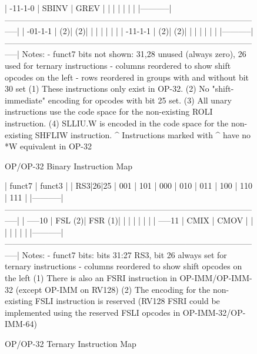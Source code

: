 \begin{figure}[t]
\begin{center}
\begin{minipage}{\linewidth}
\begin{verbnobox}[\tiny]
|  -11-1-0  |   SBINV   |    GREV   |           |           |           |           |           |           |
|-----------|-----------------------------------------------------------------------------------------------|
|  -01-1-1  |        (2)|        (2)|           |           |           |           |           |           |
|  -11-1-1  |        (2)|        (2)|           |           |           |           |           |           |
|-----------|-----------------------------------------------------------------------------------------------|
Notes:
- funct7 bits not shown: 31,28 unused (always zero), 26 used for ternary instructions
- columns reordered to show shift opcodes on the left
- rows reordered in groups with and without bit 30 set
(1) These instructions only exist in OP-32.
(2) No "shift-immediate" encoding for opcodes with bit 25 set.
(3) All unary instructions use the code space for the non-existing ROLI instruction.
(4) SLLIU.W is encoded in the code space for the non-existing SHFLIW instruction.
^ Instructions marked with ^ have no *W equivalent in OP-32
\end{verbnobox}
\end{minipage}
\end{center}
\caption{OP/OP-32 Binary Instruction Map}
\label{op-op32-bin}
\end{figure}

\begin{figure}[t]
\begin{center}
\begin{minipage}{\linewidth}
\begin{verbnobox}[\tiny]
|   funct7  |                                             funct3                                            |
| RS3|26|25 |    001    |    101    |    000    |    010    |    011    |    100    |    110    |    111    |
|-----------|-----------------------------------------------------------------------------------------------|
|  -----10  |    FSL (2)|    FSR (1)|           |           |           |           |           |           |
|  -----11  |    CMIX   |    CMOV   |           |           |           |           |           |           |
|-----------|-----------------------------------------------------------------------------------------------|
Notes:
- funct7 bits: bits 31:27 RS3, bit 26 always set for ternary instructions
- columns reordered to show shift opcodes on the left
(1) There is also an FSRI instruction in OP-IMM/OP-IMM-32 (except OP-IMM on RV128)
(2) The encoding for the non-existing FSLI instruction is reserved
(RV128 FSRI could be implemented using the reserved FSLI opcodes in OP-IMM-32/OP-IMM-64)
\end{verbnobox}
\end{minipage}
\end{center}
\caption{OP/OP-32 Ternary Instruction Map}
\label{op-op32-tern}
\end{figure}

